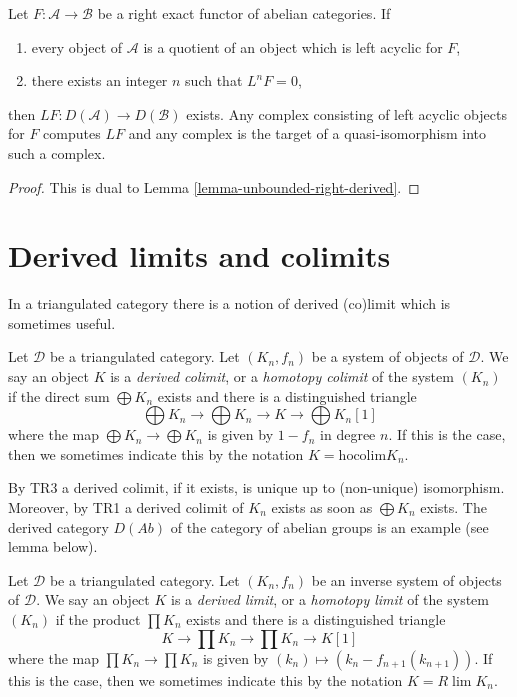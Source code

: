 \begin{lemma}
\label{lemma-unbounded-left-derived}
Let $F : \mathcal{A} \to \mathcal{B}$ be a right exact functor of
abelian categories. If
\begin{enumerate}
\item every object of $\mathcal{A}$ is a quotient of an object
which is left acyclic for $F$,
\item there exists an integer $n$ such that $L^nF = 0$,
\end{enumerate}
then $LF : D(\mathcal{A}) \to D(\mathcal{B})$ exists. Any
complex consisting of left acyclic objects for $F$ computes
$LF$ and any complex is the target of a quasi-isomorphism
into such a complex.
\end{lemma}

\begin{proof}
This is dual to Lemma \ref{lemma-unbounded-right-derived}.
\end{proof}






\section{Derived limits and colimits}
\label{section-derived-limit}

\noindent
In a triangulated category there is a notion of derived (co)limit which is
sometimes useful.

\begin{definition}
\label{definition-derived-colimit}
Let $\mathcal{D}$ be a triangulated category.
Let $(K_n, f_n)$ be a system of objects of $\mathcal{D}$.
We say an object $K$ is a {\it derived colimit}, or a
{\it homotopy colimit} of the system $(K_n)$ if
the direct sum $\bigoplus K_n$ exists and there is a distinguished triangle
$$
\bigoplus K_n \to \bigoplus K_n \to K \to \bigoplus K_n[1]
$$
where the map $\bigoplus K_n \to \bigoplus K_n$ is given
by $1 - f_n$ in degree $n$. If this is the
case, then we sometimes indicate this by the notation
$K = \text{hocolim} K_n$.
\end{definition}

\noindent
By TR3 a derived colimit, if it exists, is unique up to (non-unique)
isomorphism. Moreover, by TR1 a derived colimit of $K_n$ exists
as soon as $\bigoplus K_n$ exists. The derived category $D(\textit{Ab})$
of the category of abelian groups is an example (see lemma below).

\begin{definition}
\label{definition-derived-limit}
Let $\mathcal{D}$ be a triangulated category.
Let $(K_n, f_n)$ be an inverse system of objects of $\mathcal{D}$.
We say an object $K$ is a {\it derived limit}, or a
{\it homotopy limit} of the system $(K_n)$ if
the product $\prod K_n$ exists and there is a distinguished triangle
$$
K \to \prod K_n \to \prod K_n \to K[1]
$$
where the map $\prod K_n \to \prod K_n$ is given
by $(k_n) \mapsto (k_n - f_{n+1}(k_{n + 1}))$. If this is the
case, then we sometimes indicate this by the notation $K = R\lim K_n$.
\end{definition}

